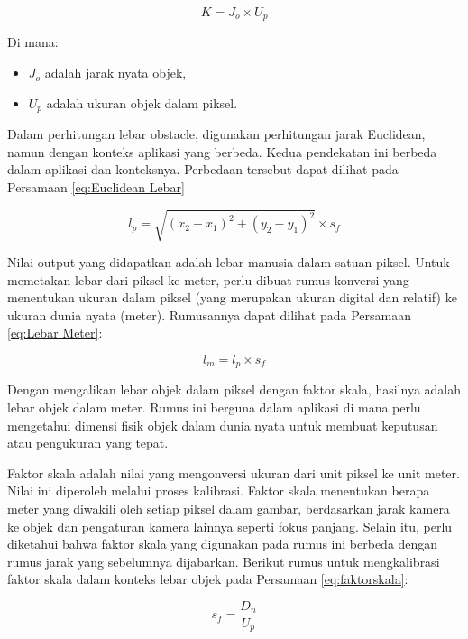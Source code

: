 \begin{equation}
\label{eq:nilaiK}
K = J_o \times U_p
\end{equation}

Di mana:
\begin{itemize}
\item $J_o$ adalah jarak nyata objek,
\item $U_p$ adalah ukuran objek dalam piksel.
\end{itemize}

Dalam perhitungan lebar obstacle, digunakan perhitungan jarak Euclidean, namun dengan konteks aplikasi yang berbeda. Kedua pendekatan ini berbeda dalam aplikasi dan konteksnya. Perbedaan tersebut dapat dilihat pada Persamaan \ref{eq:Euclidean Lebar}

\begin{equation}
\label{eq:Euclidean Lebar}
l_p = \sqrt{(x_2 - x_1)^2 + (y_2 - y_1)^2} \times s_f
\end{equation}

Nilai output yang didapatkan adalah lebar manusia dalam satuan piksel. Untuk memetakan lebar dari piksel ke meter, perlu dibuat rumus konversi yang menentukan ukuran dalam piksel (yang merupakan ukuran digital dan relatif) ke ukuran dunia nyata (meter). Rumusannya dapat dilihat pada Persamaan \ref{eq:Lebar Meter}:

\begin{equation}
\label{eq:Lebar Meter}
l_m = l_p \times s_f
\end{equation}

Dengan mengalikan lebar objek dalam piksel dengan faktor skala, hasilnya adalah lebar objek dalam meter. Rumus ini berguna dalam aplikasi di mana perlu mengetahui dimensi fisik objek dalam dunia nyata untuk membuat keputusan atau pengukuran yang tepat.

Faktor skala adalah nilai yang mengonversi ukuran dari unit piksel ke unit meter. Nilai ini diperoleh melalui proses kalibrasi. Faktor skala menentukan berapa meter yang diwakili oleh setiap piksel dalam gambar, berdasarkan jarak kamera ke objek dan pengaturan kamera lainnya seperti fokus panjang. Selain itu, perlu diketahui bahwa faktor skala yang digunakan pada rumus ini berbeda dengan rumus jarak yang sebelumnya dijabarkan. Berikut rumus untuk mengkalibrasi faktor skala dalam konteks lebar objek pada Persamaan \ref{eq:faktorskala}:

\begin{equation}
\label{eq:faktorskala}
s_f = \frac{D_n}{U_p}
\end{equation}

